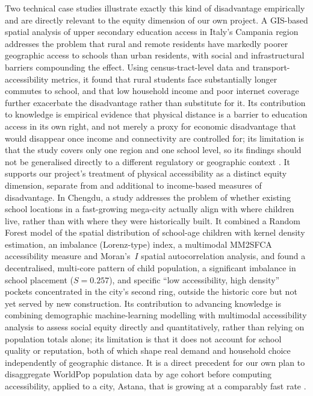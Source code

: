 \documentclass[journal]{IEEEtran}
\begin{document}
Two technical case studies illustrate exactly this kind of disadvantage empirically and are directly relevant to the equity dimension of our own project. A GIS-based spatial analysis of upper secondary education access in Italy's Campania region addresses the problem that rural and remote residents have markedly poorer geographic access to schools than urban residents, with social and infrastructural barriers compounding the effect. Using census-tract-level data and transport-accessibility metrics, it found that rural students face substantially longer commutes to school, and that low household income and poor internet coverage further exacerbate the disadvantage rather than substitute for it. Its contribution to knowledge is empirical evidence that physical distance is a barrier to education access in its own right, and not merely a proxy for economic disadvantage that would disappear once income and connectivity are controlled for; its limitation is that the study covers only one region and one school level, so its findings should not be generalised directly to a different regulatory or geographic context \cite{bruno2022italy}. It supports our project's treatment of physical accessibility as a distinct equity dimension, separate from and additional to income-based measures of disadvantage. In Chengdu, a study addresses the problem of whether existing school locations in a fast-growing mega-city actually align with where children live, rather than with where they were historically built. It combined a Random Forest model of the spatial distribution of school-age children with kernel density estimation, an imbalance (Lorenz-type) index, a multimodal MM2SFCA accessibility measure and Moran's~$I$ spatial autocorrelation analysis, and found a decentralised, multi-core pattern of child population, a significant imbalance in school placement ($S = 0.257$), and specific ``low accessibility, high density'' pockets concentrated in the city's second ring, outside the historic core but not yet served by new construction. Its contribution to advancing knowledge is combining demographic machine-learning modelling with multimodal accessibility analysis to assess social equity directly and quantitatively, rather than relying on population totals alone; its limitation is that it does not account for school quality or reputation, both of which shape real demand and household choice independently of geographic distance. It is a direct precedent for our own plan to disaggregate WorldPop population data by age cohort before computing accessibility, applied to a city, Astana, that is growing at a comparably fast rate \cite{jiang2024chengdu}.
\end{document}
